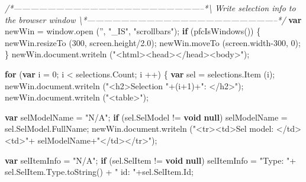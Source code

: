 \documentclass[]{article}
\newenvironment{Shaded}{}{}
\newcommand{\KeywordTok}[1]{\textcolor[rgb]{0.00,0.44,0.13}{\textbf{{#1}}}}
\newcommand{\DecValTok}[1]{\textcolor[rgb]{0.25,0.63,0.44}{{#1}}}
\newcommand{\FloatTok}[1]{\textcolor[rgb]{0.25,0.63,0.44}{{#1}}}
\newcommand{\StringTok}[1]{\textcolor[rgb]{0.25,0.44,0.63}{{#1}}}
\newcommand{\CommentTok}[1]{\textcolor[rgb]{0.38,0.63,0.69}{\textit{{#1}}}}
\newcommand{\OtherTok}[1]{\textcolor[rgb]{0.00,0.44,0.13}{{#1}}}
\newcommand{\FunctionTok}[1]{\textcolor[rgb]{0.02,0.16,0.49}{{#1}}}
\newcommand{\NormalTok}[1]{{#1}}
\begin{document}
\begin{Shaded}
\begin{Highlighting}[]
\CommentTok{/*--------------------------------------------------------------------*\textbackslash{} }
\CommentTok{  Write selection info to the browser window}
\CommentTok{\textbackslash{}*--------------------------------------------------------------------*/}  
  \KeywordTok{var} \NormalTok{newWin = }\OtherTok{window}\NormalTok{.}\FunctionTok{open} \NormalTok{(}\StringTok{''}\NormalTok{, }\StringTok{"_IS"}\NormalTok{, }\StringTok{"scrollbars"}\NormalTok{);}
  \KeywordTok{if} \NormalTok{(}\FunctionTok{pfcIsWindows}\NormalTok{())}
    \NormalTok{\{}
      \OtherTok{newWin}\NormalTok{.}\FunctionTok{resizeTo} \NormalTok{(}\DecValTok{300}\NormalTok{, }\OtherTok{screen}\NormalTok{.}\FunctionTok{height}\NormalTok{/}\FloatTok{2.0}\NormalTok{);}
      \OtherTok{newWin}\NormalTok{.}\FunctionTok{moveTo} \NormalTok{(}\OtherTok{screen}\NormalTok{.}\FunctionTok{width}\DecValTok{-300}\NormalTok{, }\DecValTok{0}\NormalTok{);}
    \NormalTok{\}}
  \OtherTok{newWin}\NormalTok{.}\OtherTok{document}\NormalTok{.}\FunctionTok{writeln} \NormalTok{(}\StringTok{"<html><head></head><body>"}\NormalTok{);}
  
  \KeywordTok{for} \NormalTok{(}\KeywordTok{var} \NormalTok{i = }\DecValTok{0}\NormalTok{; i < }\OtherTok{selections}\NormalTok{.}\FunctionTok{Count}\NormalTok{; i ++)}
    \NormalTok{\{}
      \KeywordTok{var} \NormalTok{sel = }\OtherTok{selections}\NormalTok{.}\FunctionTok{Item} \NormalTok{(i);}
      \OtherTok{newWin}\NormalTok{.}\OtherTok{document}\NormalTok{.}\FunctionTok{writeln} \NormalTok{(}\StringTok{"<h2>Selection "}\NormalTok{+(i}\DecValTok{+1}\NormalTok{)+}\StringTok{": </h2>"}\NormalTok{);}
      \OtherTok{newWin}\NormalTok{.}\OtherTok{document}\NormalTok{.}\FunctionTok{writeln} \NormalTok{(}\StringTok{"<table>"}\NormalTok{);}
      
      \KeywordTok{var} \NormalTok{selModelName = }\StringTok{"N/A"}\NormalTok{;}
      \KeywordTok{if} \NormalTok{(}\OtherTok{sel}\NormalTok{.}\FunctionTok{SelModel} \NormalTok{!= }\KeywordTok{void} \KeywordTok{null}\NormalTok{)}
    \NormalTok{selModelName = }\OtherTok{sel}\NormalTok{.}\OtherTok{SelModel}\NormalTok{.}\FunctionTok{FullName}\NormalTok{;   }
      \OtherTok{newWin}\NormalTok{.}\OtherTok{document}\NormalTok{.}\FunctionTok{writeln} \NormalTok{(}\StringTok{"<tr><td>Sel model: </td><td>"}\NormalTok{+}
                   \NormalTok{selModelName+}\StringTok{"</td></tr>"}\NormalTok{);}
      
      \KeywordTok{var} \NormalTok{selItemInfo = }\StringTok{"N/A"}\NormalTok{;}
      \KeywordTok{if} \NormalTok{(}\OtherTok{sel}\NormalTok{.}\FunctionTok{SelItem} \NormalTok{!= }\KeywordTok{void} \KeywordTok{null}\NormalTok{)}
    \NormalTok{selItemInfo = }\StringTok{"Type: "}\NormalTok{+ }\OtherTok{sel}\NormalTok{.}\OtherTok{SelItem}\NormalTok{.}\OtherTok{Type}\NormalTok{.}\FunctionTok{toString}\NormalTok{() + }
      \StringTok{" id: "}\NormalTok{+}\OtherTok{sel}\NormalTok{.}\OtherTok{SelItem}\NormalTok{.}\FunctionTok{Id}\NormalTok{;}
      

\end{Highlighting}
\end{Shaded}
\end{document}
